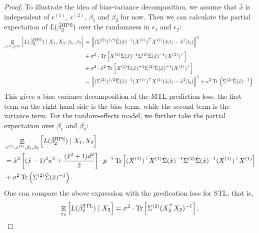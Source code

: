 \begin{proof}
 \iffalse
 To illustrate the idea of bias-variance decomposition, we assume that $\hat x$ is independent of $\epsilon^{(1)}$, $\epsilon^{(2)}$, $\beta_1$ and $\beta_2$ for now. Then we can calculate the partial expectation of $L(\hat{\beta}_2^{\textup{HPS}})$ over the randomness in $\epsilon_1$ and $\epsilon_2$:
 \begin{align}
	\exarg{\epsilon^{(1)}, \epsilon^{(2)}}{L(\hat{\beta}_2^{\MTL}) \mid X_1, X_2,\beta_1,\beta_2}  &=  \bignorm{(\Sigma^{(2)})^{1/2}\hat\Sigma(\hat x)^{-1} (X^{(1)})^{\top}X^{(1)} (\hat x \beta_1 - \hat x^2\beta_2)}^2 \nonumber\\ %
			& + \sigma^2\cdot \bigtr{ X^{(2)} \hat\Sigma(\hat x)^{-1}\Sigma^{(2)}\hat\Sigma(\hat x)^{-1} (X^{(2)})^\top} \nonumber\\
			&+ \sigma^2\cdot \hat x^2 \bigtr{ X^{(1)} \hat\Sigma(\hat x)^{-1}\Sigma^{(2)}\hat\Sigma(\hat x)^{-1} (X^{(1)})^\top}\nonumber\\
			&= \bignorm{(\Sigma^{(2)})^{1/2}\hat\Sigma(\hat x)^{-1} (X^{(1)})^{\top}X^{(1)} (\hat x \beta_1 - \hat x^2\beta_2)}^2 +\sigma^2  \tr\left(\Sigma^{(2)}\hat \Sigma(\hat x)^{-1}\right).\nonumber
\end{align}
This gives a bias-variance decomposition of the MTL prediction loss: the first term on the right-hand side is the bias term, while the second term is the variance term. For the random-effects model, we further take the partial expectation over $\beta_1$ and $\beta_2$: 
 \begin{align}
	& \mathop{\mathbb{E}}_{\varepsilon^{(1)}, \varepsilon^{(2)},\beta_1,\beta_2}\left[ L(\hat{\beta}_2^{\textup{HPS}}) \mid X_1, X_2 \right] \nonumber\\
	&	=  \hat x^2 \left[(\hat x-1)^2 \kappa^2 + \frac{(\hat x^2+1)d^2}2\right] \cdot p^{-1}\operatorname{Tr}\left[ (X^{(1)})^{\top}X^{(1)} \hat\Sigma(\hat x)^{-1} \Sigma^{(2)} \hat\Sigma(\hat x)^{-1} (X^{(1)})^{\top}X^{(1)} \right]\nonumber \\
	&+\sigma^2 \operatorname{Tr}\left(\Sigma^{(2)}\hat \Sigma(\hat x)^{-1}\right).
			\label{eq_var_2task}
\end{align}
One can compare the above expression with the predication loss for STL, that is,
\begin{align}
	\exarg{\epsilon_2}{L(\hat{\beta}_2^{\STL}) \mid X_2} = \sigma^2 \cdot \bigtr{\Sigma^{(2)} (X_2^{\top} X_2)^{-1}}, \label{eq_var_stl}

\end{align}
\end{proof}
